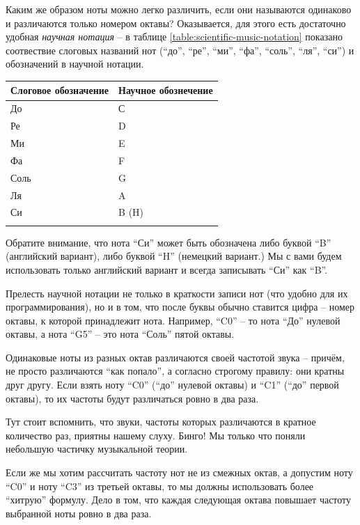 \documentclass[a4paper,twoside]{book}
\begin{document}
Каким же образом ноты можно легко различить, если они называются одинаково и
различаются только номером октавы? Оказывается, для этого есть достаточно
удобная \emph{научная нотация} -- в таблице \ref{table:scientific-music-notation}
показано соотвествие слоговых названий нот (``до'', ``ре'', ``ми'', ``фа'',
``соль'', ``ля'', ``си'') и обозначений в научной нотации.

\begin{tabular}{p{4cm}|p{4cm}}
  Слоговое обозначение & Научное обознечение \\
  \hline \hline
  До   & С \\
  \hline
  Ре   & D \\
  \hline
  Ми   & E \\
  \hline
  Фа   & F \\
  \hline
  Соль & G \\
  \hline
  Ля   & A \\
  \hline
  Си   & B (H) \\
  \hline
  \label{table:scientific-music-notation}
\end{tabular}

Обратите внимание, что нота ``Си'' может быть обозначена либо буквой ``B''
(английский вариант), либо буквой ``H'' (немецкий вариант.) Мы с вами будем
использовать только английский вариант и всегда записывать ``Си'' как ``B''.

Прелесть научной нотации не только в краткости записи нот (что удобно для их
программирования), но и в том, что после буквы обычно ставится цифра -- номер
октавы, к которой принадлежит нота. Например, ``C0'' -- то нота ``До'' нулевой
октавы, а нота ``G5'' -- это нота ``Соль'' пятой октавы.

Одинаковые ноты из разных октав различаются своей частотой звука -- причём, не
просто различаются ``как попало'', а согласно строгому правилу: они кратны друг
другу. Если взять ноту ``C0'' (``до'' нулевой октавы) и ``C1'' (``до'' первой
октавы), то их частоты будут различаться ровно в два раза.

Тут стоит вспомнить, что звуки, частоты которых различаются в кратное количество
раз, приятны нашему слуху. Бинго! Мы только что поняли небольшую частичку
музыкальной теории.

Если же мы хотим рассчитать частоту нот не из смежных октав, а допустим ноту
``C0'' и ноту ``C3'' из третьей октавы, то мы должны использовать более
``хитрую'' формулу. Дело в том, что каждая следующая октава повышает частоту
выбранной ноты ровно в два раза.
\end{document}
